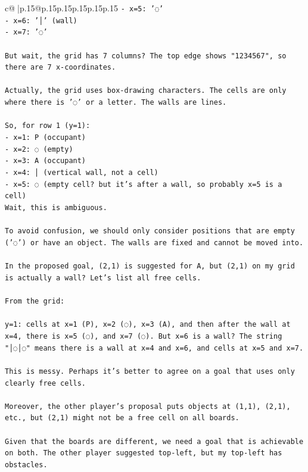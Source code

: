 \documentclass{article}
\begin{document}
{\begin{supertabular}{c@{$\;$}|p{.15\linewidth}@{}p{.15\linewidth}p{.15\linewidth}p{.15\linewidth}p{.15\linewidth}p{.15\linewidth}}
{{{\texttt{{-} x=5: '◌'} \\
\texttt{{-} x=6: '│' (wall)} \\
\texttt{{-} x=7: '◌'} \\
\\ 
\texttt{But wait, the grid has 7 columns? The top edge shows "1234567", so there are 7 x{-}coordinates.} \\
\\ 
\texttt{Actually, the grid uses box{-}drawing characters. The cells are only where there is '◌' or a letter. The walls are lines.} \\
\\ 
\texttt{So, for row 1 (y=1):} \\
\texttt{{-} x=1: P (occupant)} \\
\texttt{{-} x=2: ◌ (empty)} \\
\texttt{{-} x=3: A (occupant)} \\
\texttt{{-} x=4: │ (vertical wall, not a cell)} \\
\texttt{{-} x=5: ◌ (empty cell? but it's after a wall, so probably x=5 is a cell)} \\
\texttt{Wait, this is ambiguous.} \\
\\ 
\texttt{To avoid confusion, we should only consider positions that are empty ('◌') or have an object. The walls are fixed and cannot be moved into.} \\
\\ 
\texttt{In the proposed goal, (2,1) is suggested for A, but (2,1) on my grid is actually a wall? Let's list all free cells.} \\
\\ 
\texttt{From the grid:} \\
\\ 
\texttt{y=1: cells at x=1 (P), x=2 (◌), x=3 (A), and then after the wall at x=4, there is x=5 (◌), and x=7 (◌). But x=6 is a wall? The string "│◌│◌" means there is a wall at x=4 and x=6, and cells at x=5 and x=7.} \\
\\ 
\texttt{This is messy. Perhaps it's better to agree on a goal that uses only clearly free cells.} \\
\\ 
\texttt{Moreover, the other player's proposal puts objects at (1,1), (2,1), etc., but (2,1) might not be a free cell on all boards.} \\
\\ 
\texttt{Given that the boards are different, we need a goal that is achievable on both. The other player suggested top{-}left, but my top{-}left has obstacles.} \\
}}}
\end{supertabular}}
\end{document}
